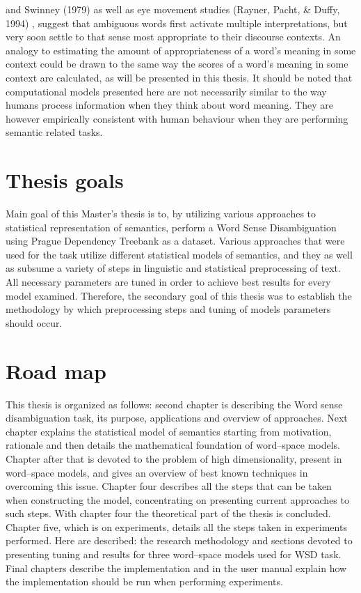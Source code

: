  and Swinney (1979)
as well as eye movement studies (Rayner, Pacht, \& Duffy, 1994)
, suggest that ambiguous words first activate multiple interpretations, but very soon settle to that sense most appropriate to their discourse contexts. An analogy to estimating the amount of appropriateness of a word's meaning in some context could be drawn to the same way the scores of a word's meaning in some context are calculated, as will be presented in this thesis. It should  be noted that computational models presented here are not necessarily similar to the way humans process information when they think about word meaning. They are however empirically consistent with human behaviour when they are performing semantic related tasks. 

\section{Thesis goals}   
Main goal of this Master's thesis is to, by utilizing various approaches to statistical representation of 
semantics, perform a Word Sense Disambiguation using Prague Dependency Treebank as a dataset. 
Various approaches that were used for the task utilize different statistical models of semantics, and they as well as subsume a variety of steps in linguistic and statistical preprocessing of text. All necessary parameters
are tuned in order to achieve best results for every model examined. Therefore, the secondary goal of this thesis was to establish the methodology by which preprocessing steps and tuning of models parameters should occur. 

\section{Road map}
This thesis is organized as follows: second chapter is describing the Word sense disambiguation task, its 
purpose, applications and overview of approaches. Next chapter explains the statistical model of 
 semantics starting from motivation, rationale and then details the mathematical foundation of 
word--space models. Chapter after that is devoted to the problem of high dimensionality, present in
word--space models, and gives an overview of best known techniques in overcoming this issue. Chapter
four describes all the steps that can be taken when constructing the model, concentrating on presenting current approaches to such steps. With chapter four the theoretical part of the thesis is concluded. Chapter five, which is on experiments, details all the steps taken in experiments performed. Here are described: the research methodology and sections devoted to presenting tuning and results for three word--space models
used for WSD task. Final chapters describe the implementation and in the user manual explain how the 
implementation should be run when performing experiments.